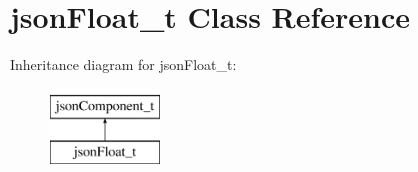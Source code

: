 \hypertarget{classjsonFloat__t}{\section{json\-Float\-\_\-t \-Class \-Reference}
\label{classjsonFloat__t}
}
\-Inheritance diagram for json\-Float\-\_\-t\-:\begin{figure}[H]
\begin{center}
\leavevmode
\includegraphics[height=2.000000cm]{classjsonFloat__t}
\end{center}
\end{figure}
